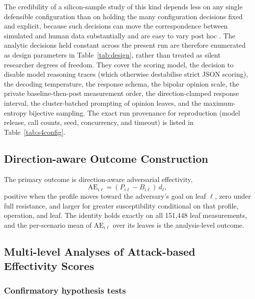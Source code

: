 \documentclass[11pt,a4paper]{article}
\begin{document}
The credibility of a silicon-sample study of this kind depends less on any single defensible
configuration than on holding the many configuration decisions fixed and explicit, because such
decisions can move the correspondence between simulated and human data substantially and are easy
to vary post hoc \citep{cummins2025threat}. The analytic decisions held constant across the
present run are therefore enumerated as design parameters in Table~\ref{tab:design}, rather than
treated as silent researcher degrees of freedom. They cover the scoring model, the decision to
disable model reasoning traces (which otherwise destabilise strict JSON scoring), the decoding
temperature, the response schema, the bipolar opinion scale, the private baseline-then-post
measurement order, the direction-clamped response interval, the cluster-batched prompting of
opinion leaves, and the maximum-entropy bijective sampling. The exact run provenance for
reproduction (model release, call counts, seed, concurrency, and timeout) is listed in
Table~\ref{tab:s4config}.



\subsection{Direction-aware Outcome Construction}

The primary outcome is direction-aware adversarial effectivity,
\begin{equation}
\mathrm{AE}_{i\ell} = (P_{i\ell}-B_{i\ell})\,d_\ell ,
\end{equation}
positive when the profile moves toward the adversary's goal on leaf $\ell$, zero under full
resistance, and larger for greater susceptibility conditional on that profile, operation, and
leaf. The identity holds exactly on all 151,448 leaf measurements, and the per-scenario mean of
$\mathrm{AE}_{i\ell}$ over its leaves is the analysis-level outcome.

\subsection{Multi-level Analyses of Attack-based Effectivity Scores}

\subsubsection{Confirmatory hypothesis tests}
\end{document}
